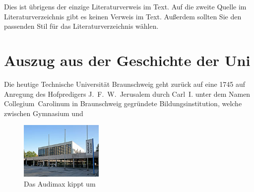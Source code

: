 \documentclass[12pt,a4paper,bibliography=totoc]{scrbook}
\begin{document}
Dies ist übrigens der einzige Literaturverweis im Text. Auf die zweite Quelle im
Literaturverzeichnis gibt es keinen Verweis im Text. Außerdem sollten Sie den
passenden Stil für das Literaturverzeichnis wählen.

\section{Auszug aus der Geschichte der Uni}
Die heutige Technische Universität Braunschweig geht zurück auf eine
1745 auf Anregung des Hofpredigers J.~F.~W.~Jerusalem durch Carl~I. unter
dem Namen Collegium~Carolinum in Braunschweig gegründete Bildungsinstitution,
welche zwischen Gymnasium und
\begin{figure}
  \begin{center}
    \includegraphics[width=4cm, angle=45]{audimax}
    \caption{Das Audimax kippt um}
    \label{fig:audimax_kippt}
  \end{center}
\end{figure}
\end{document}
